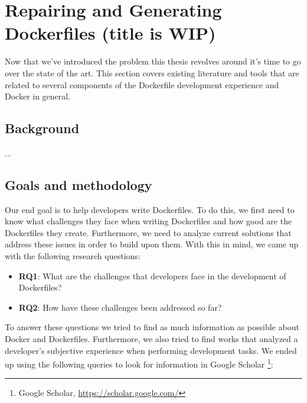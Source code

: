 \chapter{Repairing and Generating Dockerfiles (title is WIP)} \label{chap:sota}

Now that we've introduced the problem this thesis revolves around it's time to go over the state of the art.
This section covers existing literature and tools that are related to several components of the Dockerfile development experience and Docker in general.


\section{Background} \label{sec:background}
...

\section{Goals and methodology} \label{sec:goals_and_methodology}

Our end goal is to help developers write Dockerfiles. To do this, we first need to know what challenges they face when writing Dockerfiles and how good are the Dockerfiles they create. Furthermore, we need to analyze current solutions that address these issues in order to build upon them. With this in mind, we came up with the following research questions:

\begin{itemize}
    \item \textbf{RQ1}: What are the challenges that developers face in the development of Dockerfiles?
    \item \textbf{RQ2}: How have these challenges been addressed so far?
\end{itemize}

To answer these questions we tried to find as much information as possible about Docker and Dockerfiles. Furthermore, we also tried to find works that analyzed a developer's subjective experience when performing development tasks. We ended up using the following queries to look for information in Google Scholar \footnote{Google Scholar, \url{https://scholar.google.com/}}:


